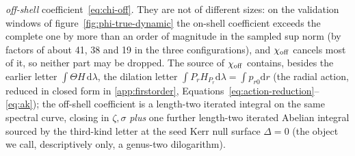 \documentclass[12pt]{iopart}
\theoremstyle{plain}
\theoremstyle{definition}
\theoremstyle{remark}
\newcommand{\dd}{\mathrm{d}}
\begin{document}
\emph{off-shell} coefficient~\eqref{eq:chi-off}. They are not of different sizes: on the
validation windows of figure~\ref{fig:phi-true-dynamic} the on-shell coefficient exceeds
the complete one by more than an order of magnitude in the sampled sup norm (by factors of
about 41, 38 and 19 in the three configurations), and $\chi_{\rm off}$ cancels most of
it, so neither part may be dropped. The source of $\chi_{\rm off}$ contains, besides the
earlier letter $\int\Theta H\,\dd\lambda$, the dilation letter $\int P_r H_{P_r}\dd\lambda=\int
p_{r0}\dd r$ (the radial action, reduced in closed form in \ref{app:firstorder},
Equations~\eqref{eq:action-reduction}--\eqref{eq:ak}); the off-shell coefficient is a
length-two iterated integral on the
same spectral curve, closing in $\zeta,\sigma$ \emph{plus} one further length-two
iterated Abelian integral sourced by the third-kind letter at the seed Kerr null
surface $\Delta=0$ (the object we call, descriptively only, a genus-two
dilogarithm).
\end{document}
